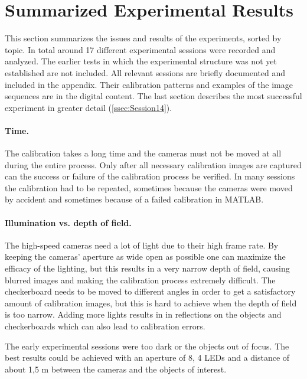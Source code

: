 \section{Summarized Experimental Results}\label{sec:ExperimentalResults}
This section summarizes the issues and results of the experiments, sorted by topic. In total around 17 different experimental sessions were recorded and analyzed. The earlier tests in which the experimental structure was not yet established are not included. All relevant sessions are briefly documented and included in the appendix. Their calibration patterns and examples of the image sequences are in the digital content. The last section describes the most successful experiment in greater detail (\autoref{ssec:Session14}).

\paragraph{Time.}
The calibration takes a long time and the cameras must not be moved at all during the entire process. Only after all necessary calibration images are captured can the success or failure of the calibration process be verified. In many sessions the calibration had to be repeated, sometimes because the cameras were moved by accident and sometimes because of a failed calibration in MATLAB.

\paragraph{Illumination vs. depth of field.}
The high-speed cameras need a lot of light due to their high frame rate. By keeping the cameras' aperture as wide open as possible one can maximize the efficacy of the lighting, but this results in a very narrow depth of field, causing blurred images and making the calibration process extremely difficult. The checkerboard needs to be moved to different angles in order to get a satisfactory amount of calibration images, but this is hard to achieve when the depth of field is too narrow. Adding more lights results in in reflections on the objects and checkerboards which can also lead to calibration errors.

The early experimental sessions were too dark or the objects out of focus. The best results could be achieved with an aperture of 8, 4 LEDs and a distance of about 1,5 m between the cameras and the objects of interest.


